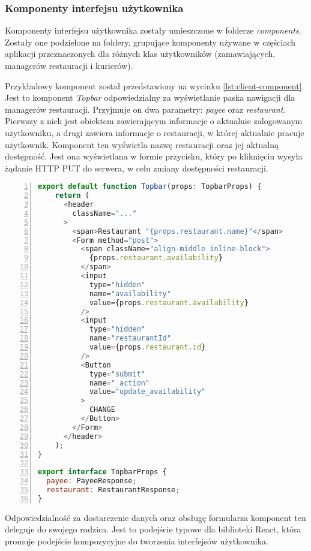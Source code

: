 \subsubsection{Komponenty interfejsu użytkownika}

Komponenty interfejsu użytkownika zostały umieszczone w folderze \textit{components}. Zostały one podzielone na foldery, grupujące komponenty używane w częściach aplikacji przeznaczonych dla różnych klas użytkowników (zamawiających, managerów restauracji i kurierów).

Przykładowy komponent został przedstawiony na wycinku \ref{lst:client-component}. Jest to komponent \textit{Topbar} odpowiedzialny za wyświetlanie paska nawigacji dla managerów restauracji. Przyjmuje on dwa parametry: \textit{payee} oraz \textit{restaurant}. Pierwszy z nich jest obiektem zawierającym informacje o aktualnie zalogowanym użytkowniku, a drugi zawiera informacje o restauracji, w której aktualnie pracuje użytkownik. Komponent ten wyświetla nazwę restauracji oraz jej aktualną dostępność. Jest ona wyświetlana w formie przycisku, który po kliknięciu wysyła żądanie HTTP PUT do serwera, w celu zmiany dostępności restauracji.

\begin{lstlisting}[caption={Kod komponentu interfejsu użytkownika - pasek nawigacji managera restauracji},label={lst:client-component},captionpos=b,language=JavaScript,numbers=left,showstringspaces=false]
export default function Topbar(props: TopbarProps) {
    return (
      <header
        className="..."
      >
        <span>Restaurant "{props.restaurant.name}"</span>
        <Form method="post">
          <span className="align-middle inline-block">
            {props.restaurant.availability}
          </span>
          <input
            type="hidden"
            name="availability"
            value={props.restaurant.availability}
          />
          <input
            type="hidden"
            name="restaurantId"
            value={props.restaurant.id}
          />
          <Button 
            type="submit" 
            name="_action" 
            value="update_availability"
          >
            CHANGE
          </Button>
        </Form>
      </header>
    );
}
  
export interface TopbarProps {
  payee: PayeeResponse;
  restaurant: RestaurantResponse;
}
\end{lstlisting}

Odpowiedzialność za dostarczenie danych oraz obsługę formularza komponent ten deleguje do swojego rodzica. Jest to podejście typowe dla biblioteki React, która promuje podejście kompozycyjne do tworzenia interfejsów użytkownika.

